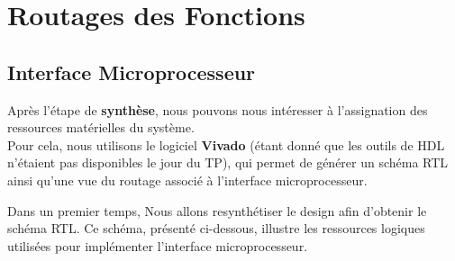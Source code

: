 \section{Routages des Fonctions
}
\subsection{Interface Microprocesseur}

Après l’étape de \textbf{synthèse}, nous pouvons nous intéresser à l’assignation des ressources matérielles du système.\\
Pour cela, nous utilisons le logiciel \textbf{Vivado} (étant donné que les outils de HDL n’étaient pas disponibles le jour du TP), qui permet de générer un schéma RTL ainsi qu’une vue du routage associé à l’interface microprocesseur.
\newline

Dans un premier temps, Nous allons resynthétiser le design afin d’obtenir le schéma RTL.
Ce schéma, présenté ci-dessous, illustre les ressources logiques utilisées pour implémenter l’interface microprocesseur.
\newline


